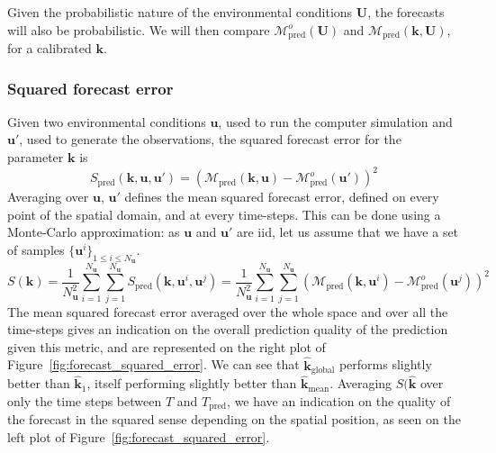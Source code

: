 \documentclass[preprint, 1p]{elsarticle}
\newcommand{\hatkmean}{\hat{\mathbf{k}}_{\mathrm{mean}}}
\newcommand{\kest}{\hat{\mathbf{k}}}
\begin{document}
Given the probabilistic nature of the environmental conditions $\mathbf{U}$, the forecasts will also be probabilistic. We will then compare $\mathcal{M}_{\mathrm{pred}}^o(\mathbf{U})$ and $\mathcal{M}_{\mathrm{pred}}(\mathbf{k},\mathbf{U})$, for a calibrated $\mathbf{k}$.

\subsubsection{Squared forecast error}
Given two environmental conditions $\mathbf{u}$, used to run the computer simulation and $\mathbf{u}'$, used to generate the observations, the squared forecast error for the parameter $\mathbf{k}$ is
\begin{equation}
\label{eq:squared_forecast_error}
S_{\mathrm{pred}}(\mathbf{k},\mathbf{u},\mathbf{u}') = \left(\mathcal{M}_{\mathrm{pred}}(\mathbf{k},\mathbf{u}) - \mathcal{M}^{o}_{\mathrm{pred}}(\mathbf{u}')\right)^2
\end{equation}
Averaging over $\mathbf{u}$, $\mathbf{u}'$ defines the mean squared forecast error, defined on every point of the spatial domain, and at every time-steps. This can be done using a Monte-Carlo approximation: as $\mathbf{u}$ and $\mathbf{u}'$ are iid, let us assume that we have a set of samples $\{\mathbf{u}^i\}_{1\leq i \leq N_{\mathbf{u}}}$. 
\begin{equation}
  \label{eq:squared_forecast_error_averaged}
  S(\mathbf{k}) = \frac{1}{N_{\mathbf{u}}^2 }\sum_{i=1}^{N_{\mathbf{u}}}\sum_{j=1}^{N_{\mathbf{u}}} S_{\mathrm{pred}}(\mathbf{k},\mathbf{u}^i,\mathbf{u}^j) = \frac{1}{N_{\mathbf{u}}^2 }\sum_{i=1}^{N_{\mathbf{u}}}\sum_{j=1}^{N_{\mathbf{u}}}  \left(\mathcal{M}_{\mathrm{pred}}(\mathbf{k},\mathbf{u}^i) - \mathcal{M}^{o}_{\mathrm{pred}}(\mathbf{u}^j)\right)^2
\end{equation}
The mean squared forecast error averaged over the whole space and over all the time-steps gives an indication on the overall prediction quality of the prediction given this metric, and are represented on the right plot of Figure~\ref{fig:forecast_squared_error}. We can see that $\kest_{\mathrm{global}}$ performs slightly better than $\kest_1$, itself performing slightly better than $\hatkmean$.
Averaging $S(\mathbf{\kest}$ over only the time steps between $T$ and $T_{\mathrm{pred}}$, we have an indication on the quality of the forecast in the squared sense depending on the spatial position, as seen on the left plot of Figure~\ref{fig:forecast_squared_error}.
\end{document}
